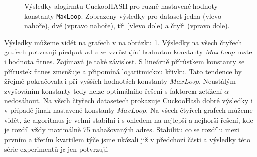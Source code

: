 \begin{figure}[!ht]
\caption{Výsledky alogirmtu CuckooHASH pro ruzně nastavené hodnoty konstanty \texttt{MaxLoop}. Zobrazeny výsledky pro dataset jedna (vlevo nahoře),
	dvě (vpravo nahoře), tři (vlevo dole) a čtyři (vpravo dole).}
\label{fig:cuckoo_maxloop}
\end{figure}

Výsledky můžeme vidět na grafech v na obrázku \ref{fig:cuckoo_maxloop}. Výsledky na všech čtyřech grafech potvrzují předpoklad a se vzrůstající hodnotou
konstanty $MaxLoop$ roste i hodnota fitnes. Zajímavá je také závislost. S lineárně přírůstkem konstanty se přírustek fitnes zmenšuje a připomíná logaritmickou
křivku. Tato tendence by žřejmě pokračovala i při vyšších hodnotách konstanty $MaxLoop$. Neustálým zvyšováním konstanty tedy nelze optimálního řešení
s faktorem zetížení $\alpha$ nedosáhout. Na všech čtyřech datasetech prokazuje CuckooHash dobré výsledky i v případě jinak nastavené konstanty $MaxLoop$.
Na všech čtyřech grafech můžeme vidět, že algoritmus je velmi stabilní i s ohledem na nejlepší a nejhorší řešení, kde je rozdíl vždy maximálně 75 nahašovaných 
adres. Stabilitu co se rozdílu mezi prvním a třetím kvartilem týče jsme ukázali již v předchozí části a výsledky této série experimentů je jen potvrzují.

